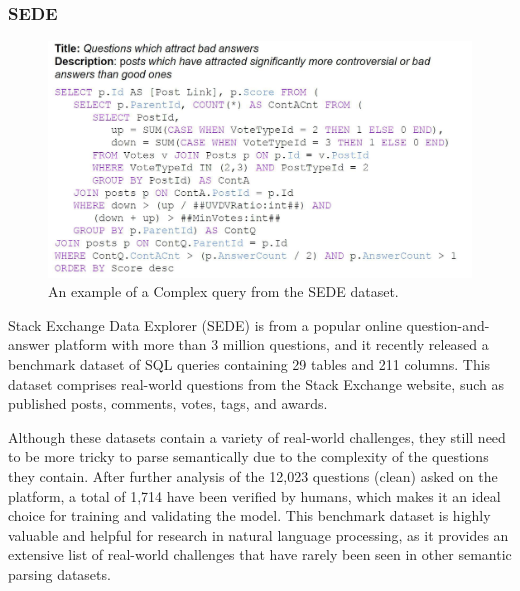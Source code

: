 \subsubsection{SEDE}

\begin{figure}[htbp]
    \centering
    \includegraphics[width=0.8\linewidth]{pics/sede_sql.jpg}
    \caption{An example of a Complex query from the SEDE dataset.\cite{DBLP:journals/corr/abs-2106-05006}}
    \label{fig:sede_sql}
\end{figure}

Stack Exchange Data Explorer (SEDE)\cite{DBLP:journals/corr/abs-2106-05006} is from a popular online question-and-answer platform with more than 3 million questions, and it recently released a benchmark dataset of SQL queries containing 29 tables and 211 columns. This dataset comprises real-world questions from the Stack Exchange website, such as published posts, comments, votes, tags, and awards.

Although these datasets contain a variety of real-world challenges, they still need to be more tricky to parse semantically due to the complexity of the questions they contain. After further analysis of the 12,023 questions (clean) asked on the platform, a total of 1,714 have been verified by humans, which makes it an ideal choice for training and validating the model. This benchmark dataset is highly valuable and helpful for research in natural language processing, as it provides an extensive list of real-world challenges that have rarely been seen in other semantic parsing datasets.
